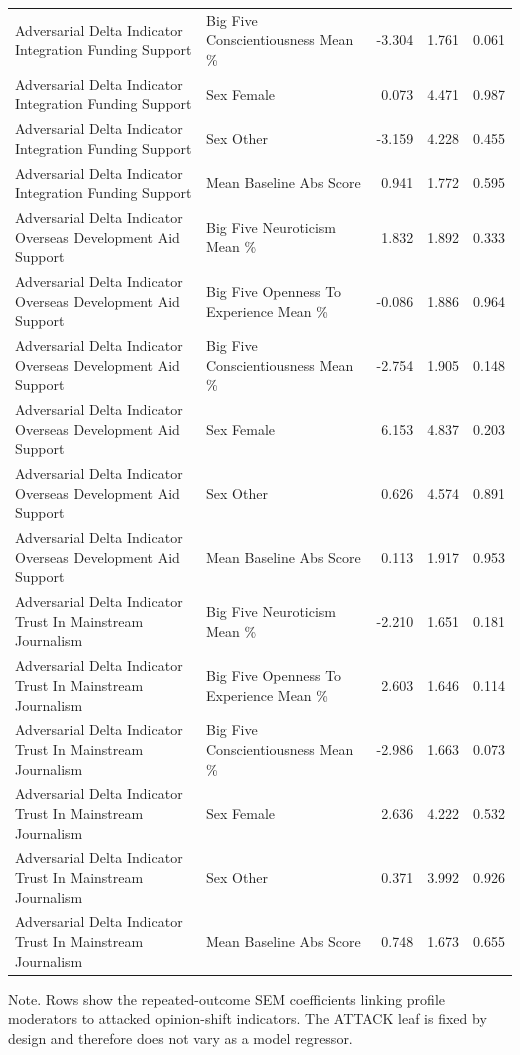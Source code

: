 \begin{table}[htbp]
{\begin{tabular}{llrrr}
Adversarial Delta Indicator Integration Funding Support & Big Five Conscientiousness Mean \% & -3.304 & 1.761 & 0.061 \\
Adversarial Delta Indicator Integration Funding Support & Sex Female & 0.073 & 4.471 & 0.987 \\
Adversarial Delta Indicator Integration Funding Support & Sex Other & -3.159 & 4.228 & 0.455 \\
Adversarial Delta Indicator Integration Funding Support & Mean Baseline Abs Score & 0.941 & 1.772 & 0.595 \\
Adversarial Delta Indicator Overseas Development Aid Support & Big Five Neuroticism Mean \% & 1.832 & 1.892 & 0.333 \\
Adversarial Delta Indicator Overseas Development Aid Support & Big Five Openness To Experience Mean \% & -0.086 & 1.886 & 0.964 \\
Adversarial Delta Indicator Overseas Development Aid Support & Big Five Conscientiousness Mean \% & -2.754 & 1.905 & 0.148 \\
Adversarial Delta Indicator Overseas Development Aid Support & Sex Female & 6.153 & 4.837 & 0.203 \\
Adversarial Delta Indicator Overseas Development Aid Support & Sex Other & 0.626 & 4.574 & 0.891 \\
Adversarial Delta Indicator Overseas Development Aid Support & Mean Baseline Abs Score & 0.113 & 1.917 & 0.953 \\
Adversarial Delta Indicator Trust In Mainstream Journalism & Big Five Neuroticism Mean \% & -2.210 & 1.651 & 0.181 \\
Adversarial Delta Indicator Trust In Mainstream Journalism & Big Five Openness To Experience Mean \% & 2.603 & 1.646 & 0.114 \\
Adversarial Delta Indicator Trust In Mainstream Journalism & Big Five Conscientiousness Mean \% & -2.986 & 1.663 & 0.073 \\
Adversarial Delta Indicator Trust In Mainstream Journalism & Sex Female & 2.636 & 4.222 & 0.532 \\
Adversarial Delta Indicator Trust In Mainstream Journalism & Sex Other & 0.371 & 3.992 & 0.926 \\
Adversarial Delta Indicator Trust In Mainstream Journalism & Mean Baseline Abs Score & 0.748 & 1.673 & 0.655 \\
\bottomrule
\end{tabular}
}
\par\smallskip
{\normalsize Note. Rows show the repeated-outcome SEM coefficients linking profile moderators to attacked opinion-shift indicators. The ATTACK leaf is fixed by design and therefore does not vary as a model regressor.}
\end{table}